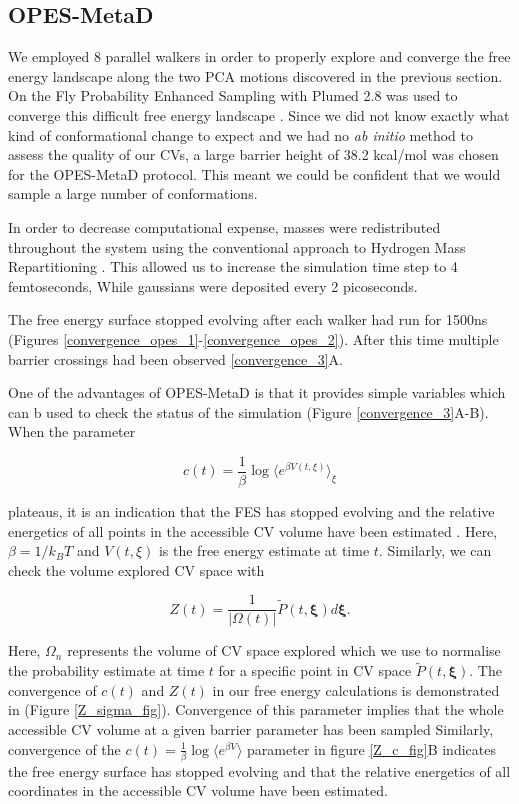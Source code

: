 \subsection{OPES-MetaD}
We employed 8 parallel walkers in order to properly explore and converge the free energy landscape along the two PCA motions discovered in the previous section. On the Fly Probability Enhanced Sampling with Plumed 2.8 was used to converge this difficult free energy landscape \cite{invernizzi2020, tribello2014}. Since we did not know exactly what kind of conformational change to expect and we had no \textit {ab initio} method to assess the quality of our CVs, a large barrier height of 38.2 kcal/mol was chosen for the OPES-MetaD protocol. This meant we could be confident that we would sample a large number of conformations. 

In order to decrease computational expense, masses were redistributed throughout the system using the conventional approach to Hydrogen Mass Repartitioning \cite{hopkins2015, balusek2019}. This allowed us to increase the simulation time step to 4 femtoseconds, While gaussians were deposited every 2 picoseconds.

The free energy surface stopped evolving after each walker had run for 1500ns (Figures \ref{convergence_opes_1}-\ref{convergence_opes_2}). After this time multiple barrier crossings had been observed \ref{convergence_3}A.

One of the advantages of OPES-MetaD is that it provides simple variables which can b used to check the status of the simulation (Figure \ref{convergence_3}A-B). When the parameter 

\begin{equation}
	c(t) = \frac{1}{\beta} \log \langle e^{\beta V(t,\xi)} \rangle_\xi
\end{equation} 

plateaus, it is an indication that the FES has stopped evolving and the relative energetics of all points in the accessible CV volume have been estimated \cite{invernizzi2020, tiwary2015}. Here, $\beta=1/k_BT$ and $V(t,\xi)$ is the free energy estimate at time $t$. Similarly, we can check the volume explored CV space with  

\begin{equation}
Z(t) = \frac{1}{| \Omega(t)|}  \tilde{P}(t, \mathbf{\xi}) d\mathbf{\xi}.
\end{equation} 

Here, $\Omega_n$ represents the volume of CV space explored which we use to normalise the probability estimate at time $t$ for a specific point in CV space $\tilde{P}(t, \mathbf{\xi})$. The convergence of $c(t)$ and $Z(t)$ in our free energy calculations is demonstrated in (Figure \ref{Z_sigma_fig}). Convergence of this parameter implies that the whole accessible CV volume at a given barrier parameter has been sampled Similarly, convergence of the $c(t) = \frac{1}{\beta} \log \langle e^{\beta V} \rangle$ parameter in figure \ref{Z_c_fig}B indicates the free energy surface has stopped evolving and that the relative energetics of all coordinates in the accessible CV volume have been estimated.  

